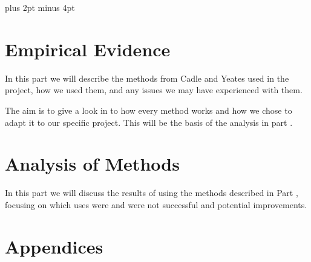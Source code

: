 \documentclass[a4paper,titlepage]{article}
\begin{document}


\parindent=0pt %
\parskip=8pt plus 2pt minus 4pt

\setcounter{page}{1}

\tableofcontents
\newpage

\begin{spacing}{1.15}

\pagebreak

\pagebreak

\part{Empirical Evidence}
\label{chap:Empiri}
In this part we will describe the methods from Cadle and Yeates\cite{caye} used in the project, how we used them, and any issues we may have experienced with them.

The aim is to give a look in to how every method works and how we chose to adapt it to our specific project. This will be the basis of the analysis in part \ref{chap:Analysis}.






\pagebreak

\part{Analysis of Methods}
\label{chap:Analysis}
In this part we will discuss the results of using the methods described in Part \ref{chap:Empiri}, focusing on which uses were and were not successful and potential improvements.






\pagebreak



\end{spacing}
\pagebreak


\newpage
\appendix
\part*{Appendices}







%
\end{document}
